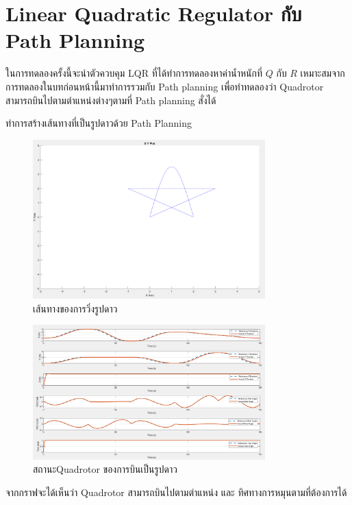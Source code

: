 \clearpage
\section{Linear Quadratic Regulator กับ Path Planning}
ในการทดลองครั้งนี้จะนำตัวควบคุม LQR ที่ได้ทำการทดลองหาค่าน้ำหนักที่ $Q$ กับ $R$ เหมาะสมจากการทดลองในบทก่อนหน้านี้มาทำการรวมกับ Path planning
เพื่อทำทดลองว่า Quadrotor สามารถบินไปตามตำแหน่งต่างๆตามที่ Path planning สั่งได้

ทำการสร้างเส้นทางที่เป็นรูปดาวด้วย Path Planning
\begin{figure}[!ht]
	\centering
	\includegraphics[width=0.8\textwidth]{images/simulink/star.png}
	\caption{เส้นทางของการวิ่งรูปดาว}
\end{figure}
\begin{figure}[!ht]
	\centering
	\includegraphics[width=0.8\textwidth]{images/simulink/simulation_star.png}
	\caption{สถานะQuadrotor ของการบินเป็นรูปดาว}
\end{figure}

จากกราฟจะได้เห็นว่า Quadrotor สามารถบินไปตามตำแหน่ง และ ทิศทางการหมุนตามที่ต้องการได้